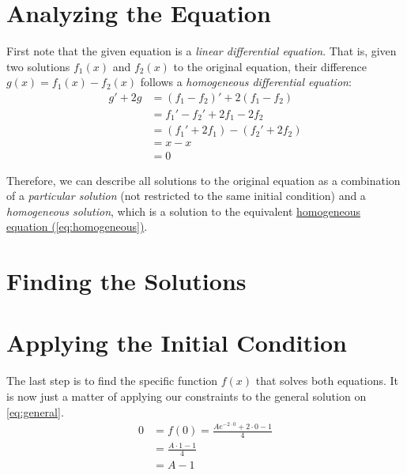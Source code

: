 \section*{Analyzing the Equation}

    First note that the given equation is a \textit{linear differential equation}. That is, given two solutions $f_1(x)$ and $f_2(x)$ to the original equation, their difference $g(x) = f_1(x) - f_2(x)$ follows a \textit{homogeneous differential equation}:
    \begin{align}
        g' + 2g &= \left(f_1 - f_2\right)' + 2\left(f_1 - f_2\right) \nonumber\\
            &= f_1' - f_2' + 2f_1 - 2f_2 \nonumber\\
            &= \left(f_1' + 2f_1\right) - \left(f_2' + 2f_2\right) \nonumber\\
            &= x - x \nonumber\\
            &= 0 \label{eq:homogeneous}
    \end{align}

    Therefore, we can describe all solutions to the original equation as a combination of a \textit{particular solution} (not restricted to the same initial condition) and a \textit{homogeneous solution}, which is a solution to the equivalent \hyperref[eq:homogeneous]{homogeneous equation (\ref*{eq:homogeneous})}.

\section*{Finding the Solutions}

    
    
    

\newpage

\section*{Applying the Initial Condition}

    The last step is to find the specific function $f(x)$ that solves both equations. It is now just a matter of applying our constraints to the general solution on \cref{eq:general}.
    \begin{align*}
        0 &= f(0) = \frac{A e^{-2 \cdot 0} + 2 \cdot 0 - 1}{4} \\
        &= \frac{A \cdot 1 - 1}{4} \\
        &= A - 1
    \end{align*}

